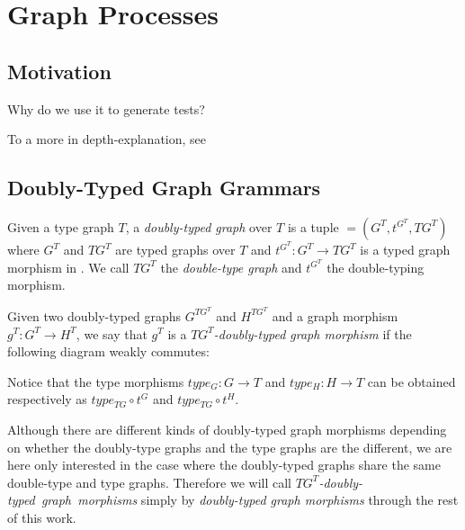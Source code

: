 \chapter{Graph Processes}

\section{Motivation}

Why do we use it to generate tests?

To a more in depth-explanation, see~\cite{Ribeiro1996} 

\section{Doubly-Typed Graph Grammars}

\begin{definition} Given a type graph $T$, a \emph{doubly-typed graph} \doublyTypedGraph{} over $T$ is a tuple \doublyTypedGraph $= \left(G^T, t^{G^T},TG^T\right)$ where $G^T$ and $TG^T$ are typed graphs over $T$ and \mbox{$t^{G^T} : G^T \rightarrow TG^T$} is a typed graph morphism in \typedGraphCategory{}. We call $TG^T$ the \emph{double-type graph} and $t^{G^T}$ the double-typing morphism.

\end{definition}

\begin{definition}
  Given two doubly-typed graphs $G^{TG^T}$ and $H^{TG^T}$ and a graph morphism $g^T : G^T \rightarrow H^T$, we say that $g^T$ is a \emph{$TG^T$-doubly-typed graph morphism} if the following diagram weakly commutes:

\end{definition}

Notice that the type morphisms $type_G : G \rightarrow T$ and $type_H : H \rightarrow T$ can be obtained respectively as $type_{TG} \circ t^G$ and $type_{TG} \circ t^H$.

\begin{remark} Although there are different kinds of doubly-typed graph morphisms depending on whether the doubly-type graphs and the type graphs are the different, we are here only interested in the case where the doubly-typed graphs share the same double-type and type graphs. Therefore we will call \mbox{\emph{$TG^T$-doubly-typed graph morphisms}} simply by \emph{doubly-typed graph morphisms} through the rest of this work.

\end{remark}

